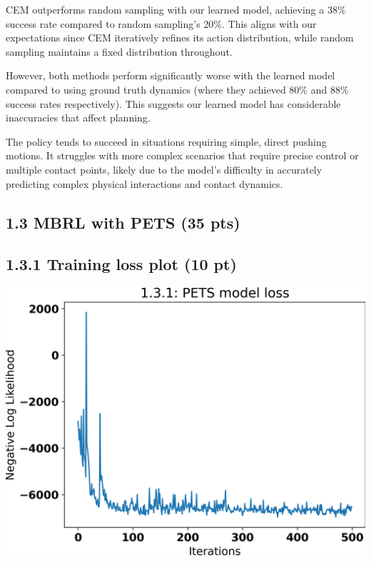 \documentclass[12pt]{article}
\begin{document}
\begin{tcolorbox}[fit,height=20em, width=40em, blank, borderline={1pt}{1pt},nobeforeafter]
CEM outperforms random sampling with our learned model, achieving a 38\% success rate compared to random sampling's 20\%. This aligns with our expectations since CEM iteratively refines its action distribution, while random sampling maintains a fixed distribution throughout.

However, both methods perform significantly worse with the learned model compared to using ground truth dynamics (where they achieved 80\% and 88\% success rates respectively). This suggests our learned model has considerable inaccuracies that affect planning.

The policy tends to succeed in situations requiring simple, direct pushing motions. It struggles with more complex scenarios that require precise control or multiple contact points, likely due to the model's difficulty in accurately predicting complex physical interactions and contact dynamics.
\end{tcolorbox}


\subsection*{1.3 MBRL with PETS (35 pts)}

\subsection*{1.3.1 Training loss plot (10 pt)}

\begin{tcolorbox}[fit,height=30em, width=40em, blank, borderline={1pt}{1pt},nobeforeafter]
\begin{center}
    \includegraphics[width=40em]{1.3.1-loss}
\end{center}
\end{tcolorbox}
\end{document}
